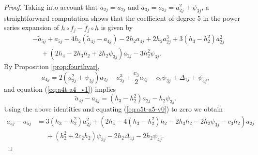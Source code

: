 \begin{proof}
Taking into account that $\tilde{a}_{2j}=a_{2j}$ and $\tilde{a}_{3j}=a_{3j}=a_{2j}^2+\psi_{3j}$, a straightforward computation shows that the coefficient of degree 5 in the power series expansion of $h\circ f_j-\tilde{f}_j\circ h$ is given by
\begin{align}\label{eq:a5t-a5-v0}
&- \tilde{a}_{5j}+a_{5j}-4h_2(\tilde{a}_{4j}-a_{4j})-2h_2a_{4j}+2h_2a_{2j}^3+3(h_3-h_2^2)a_{2j}^2 \nonumber \\
&\phantom{-}+(2h_4-2h_3h_2+2h_2\psi_{3j})a_{2j}-3h_2^2\psi_{3j}. 
\end{align}
By Proposition \ref{prop:fourthvar}, 
\[ a_{4j}=2(a_{2j}^2+\psi_{3j})a_{2j}-a_{2j}^3+\frac{c_3}{2}a_{2j}-c_2\psi_{3j}+\Delta_{1j}+\psi_{4j}, \] 
and equation (\ref{eq:a4t-a4_v1}) implies 
\[ \tilde{a}_{4j}-a_{4j}=(h_3-h_2^2)a_{2j}-h_2\psi_{3j}. \] 
Using the above identities and equating (\ref{eq:a5t-a5-v0}) to zero we obtain
\begin{align}\label{eq:a5t-a5-v1}
\tilde{a}_{5j}-a_{5j} &= 3(h_3-h_2^2)a_{2j}^2+(2h_4-4(h_3-h_2^2)h_2-2h_3h_2-2h_2\psi_{3j}-c_3h_2)a_{2j} \nonumber \\
		      &\phantom{=} +(h_2^2+2c_2h_2)\psi_{3j}-2h_2\Delta_{1j}-2h_2\psi_{4j}.
\end{align}


\end{proof}
